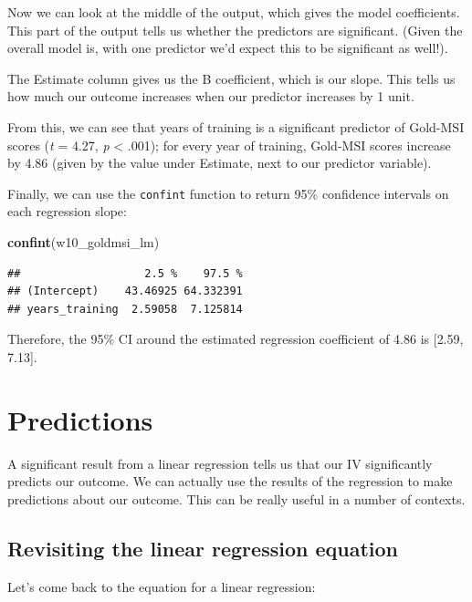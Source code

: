 \documentclass[
]{book}
\newenvironment{Shaded}{\begin{snugshade}}{\end{snugshade}}
\newcommand{\FunctionTok}[1]{\textcolor[rgb]{0.13,0.29,0.53}{\textbf{#1}}}
\newcommand{\NormalTok}[1]{#1}
\begin{document}
Now we can look at the middle of the output, which gives the model coefficients. This part of the output tells us whether the predictors are significant. (Given the overall model is, with one predictor we'd expect this to be significant as well!).

The Estimate column gives us the B coefficient, which is our slope. This tells us how much our outcome increases when our predictor increases by 1 unit.

From this, we can see that years of training is a significant predictor of Gold-MSI scores (\emph{t} = 4.27, \emph{p} \textless{} .001); for every year of training, Gold-MSI scores increase by 4.86 (given by the value under Estimate, next to our predictor variable).

Finally, we can use the \texttt{confint} function to return 95\% confidence intervals on each regression slope:

\begin{Shaded}
\begin{Highlighting}[]
\FunctionTok{confint}\NormalTok{(w10\_goldmsi\_lm)}
\end{Highlighting}
\end{Shaded}

\begin{verbatim}
##                   2.5 %    97.5 %
## (Intercept)    43.46925 64.332391
## years_training  2.59058  7.125814
\end{verbatim}

Therefore, the 95\% CI around the estimated regression coefficient of 4.86 is {[}2.59, 7.13{]}.

\hypertarget{predictions}{%
\section{Predictions}\label{predictions}}

A significant result from a linear regression tells us that our IV significantly predicts our outcome. We can actually use the results of the regression to make predictions about our outcome. This can be really useful in a number of contexts.

\hypertarget{revisiting-the-linear-regression-equation}{%
\subsection{Revisiting the linear regression equation}\label{revisiting-the-linear-regression-equation}}

Let's come back to the equation for a linear regression:
\end{document}
